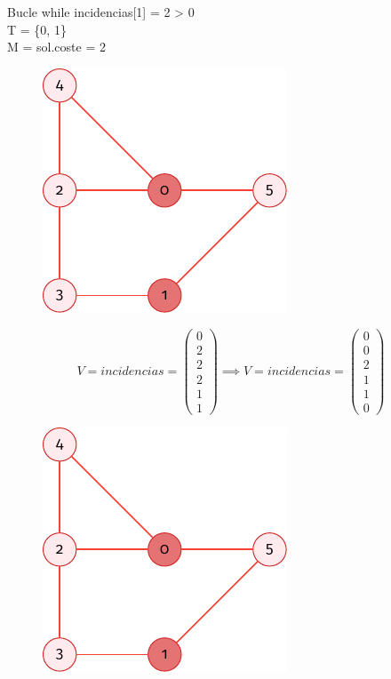 \documentclass[spanish]{beamer}
\begin{document}
\begin{frame}{Bucle while}
	incidencias[1] = 2 > 0\\
	T = \{0, 1\}\\
	M = sol.coste = 2
	\begin{figure}[H]
		\centering \includegraphics{./img/grafo-ejemplo-2.pdf}
	\end{figure}
\end{frame}

\begin{frame}{}
	$$  V = incidencias =
	\begin{pmatrix}
	  0 \\
	  2 \\
	  2 \\
	  2 \\
	  1 \\
	  1
	\end{pmatrix} \implies  V = incidencias =
	\begin{pmatrix}
	  0 \\
	  0 \\
	  2 \\
	  1 \\
	  1 \\
	  0
	\end{pmatrix}$$
	\begin{figure}[H]
		\centering \includegraphics{./img/grafo-ejemplo-2.pdf}
	\end{figure}
\end{frame}
\end{document}
